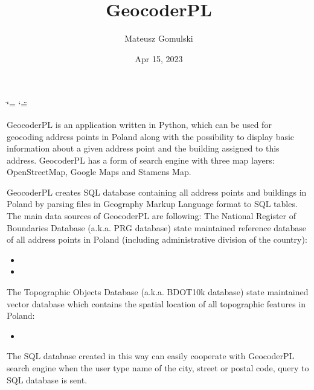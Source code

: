 \documentclass[letterpaper,10pt,english]{sphinxmanual}
\title{GeocoderPL}
\date{Apr 15, 2023}
\author{Mateusz Gomulski}
\begin{document}
\ifdefined\shorthandoff
  \ifnum\catcode`\=\string=\active\shorthandoff{=}\fi
  \ifnum\catcode`\"=\active{}\fi
\fi

\pagestyle{empty}
\sphinxmaketitle
\pagestyle{plain}
\sphinxtableofcontents
\pagestyle{normal}
\label{\detokenize{index::doc}}


\sphinxAtStartPar
GeocoderPL is an application written in Python, which can be used for geocoding address points in Poland along with the possibility to display basic information about a given address point and the building assigned to this address. GeocoderPL has a form of search engine with three map layers: OpenStreetMap, Google Maps and Stamens Map.

\sphinxAtStartPar
GeocoderPL creates SQL database containing all address points and buildings in Poland by parsing files in Geography Markup Language format to SQL tables. The main data sources of GeocoderPL are following:
The National Register of Boundaries Database (a.k.a. PRG database)\sphinxhyphen{} state maintained reference database of all address points in Poland (including administrative division of the country):
\begin{itemize}
\item {} 
\sphinxAtStartPar
{}

\item {} 
\sphinxAtStartPar
{}

\end{itemize}

\sphinxAtStartPar
The Topographic Objects Database (a.k.a. BDOT10k database) \sphinxhyphen{} state maintained vector database which contains the spatial location of all topographic features in Poland:
\begin{itemize}
\item {} 
\sphinxAtStartPar
{}

\end{itemize}

\sphinxAtStartPar
The SQL database created in this way can easily cooperate with GeocoderPL search engine \sphinxhyphen{} when the user type name of the city, street or postal code, query to SQL database is sent.
\end{document}
